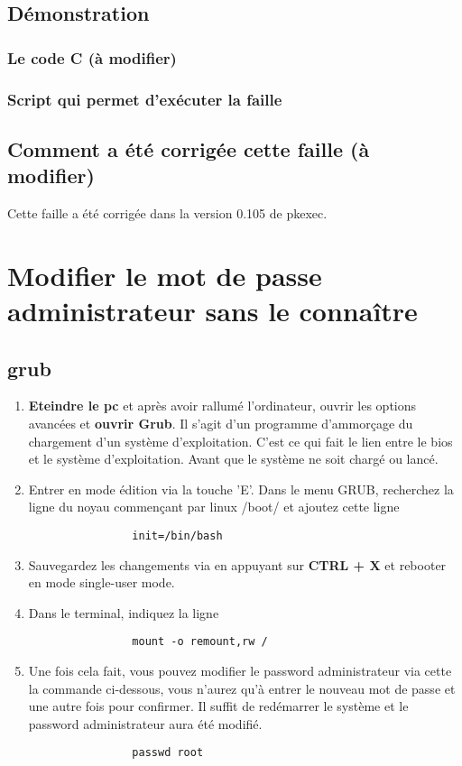 \documentclass[a4paper, 12pt]{article}
\begin{document}
   		
   		\newpage
   		\subsection{Démonstration}
			\subsubsection{Le code C (à modifier) }   		
			
			  
				
			\subsubsection{Script qui permet d'exécuter la faille}   	
			
		\subsection{Comment a été corrigée cette faille (à modifier)}
		Cette faille a été corrigée dans la version 0.105 de pkexec.

   \section{Modifier le mot de passe administrateur sans le connaître}
        \subsection{grub}
        \begin{enumerate}
        	\item \textbf{Eteindre le pc} et après avoir rallumé l'ordinateur, ouvrir les options avancées et \textbf{ouvrir Grub}. Il s'agit d'un programme d'ammorçage du chargement d'un système d'exploitation. C'est ce qui fait le lien entre le bios et le système d'exploitation. Avant que le système ne soit chargé ou lancé.
        	\item Entrer en mode édition via la touche 'E'. Dans le menu GRUB, recherchez la ligne du noyau commençant par linux /boot/ et ajoutez cette ligne
        	\begin{lstlisting}
        		init=/bin/bash
        	\end{lstlisting}
        	\item Sauvegardez les changements via en appuyant sur \textbf{CTRL + X} et rebooter en mode single-user mode.
        	\item Dans le terminal, indiquez la ligne
        	\begin{lstlisting}
        		mount -o remount,rw /
        	\end{lstlisting}
        	\item Une fois cela fait, vous pouvez modifier le password administrateur via cette la commande ci-dessous, vous n'aurez qu'à entrer le nouveau mot de passe et une autre fois pour confirmer. Il suffit de redémarrer le système et le password administrateur aura été modifié. 
        	\begin{lstlisting}
        		passwd root
        	\end{lstlisting}
        \end{enumerate}
\end{document}
